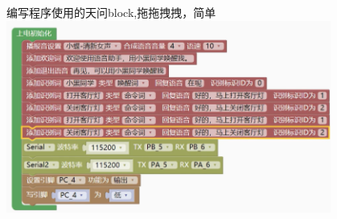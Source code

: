 \documentclass[16pt]{beamer}	%
\begin{document}
		 \begin{frame}
		  编写程序使用的天问block,拖拖拽拽，简单
		  \\\centering \includegraphics [width=0.8\textwidth]{pic/5-4.png}
		 \end{frame}
\end{document}
